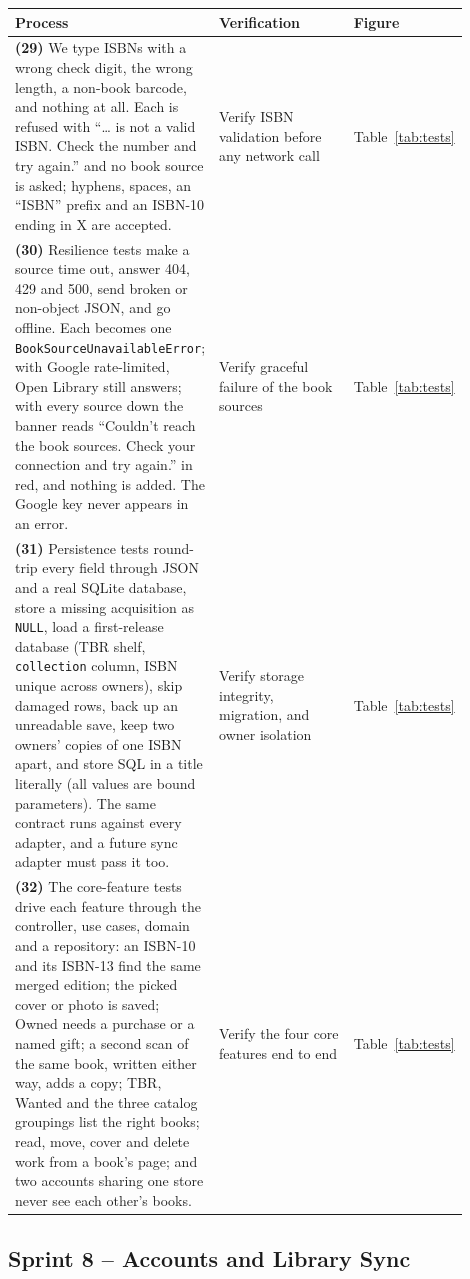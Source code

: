 \documentclass[12pt]{article}
\begin{document}
\begin{longtable}{L{0.4\linewidth} L{0.36\linewidth} L{0.14\linewidth}}
\toprule
\textbf{Process} & \textbf{Verification} & \textbf{Figure} \\
\midrule
\endhead
\textbf{(29)} We type ISBNs with a wrong check digit, the wrong length, a non-book barcode, and nothing at all. Each is refused with ``\ldots{} is not a valid ISBN. Check the number and try again.'' and no book source is asked; hyphens, spaces, an ``ISBN'' prefix and an ISBN-10 ending in X are accepted. & Verify ISBN validation before any network call & Table~\ref{tab:tests} \\
\textbf{(30)} Resilience tests make a source time out, answer 404, 429 and 500, send broken or non-object JSON, and go offline. Each becomes one \texttt{BookSourceUnavailableError}; with Google rate-limited, Open Library still answers; with every source down the banner reads ``Couldn't reach the book sources. Check your connection and try again.'' in red, and nothing is added. The Google key never appears in an error. & Verify graceful failure of the book sources & Table~\ref{tab:tests} \\
\textbf{(31)} Persistence tests round-trip every field through JSON and a real SQLite database, store a missing acquisition as \texttt{NULL}, load a first-release database (TBR shelf, \texttt{collection} column, ISBN unique across owners), skip damaged rows, back up an unreadable save, keep two owners' copies of one ISBN apart, and store SQL in a title literally (all values are bound parameters). The same contract runs against every adapter, and a future sync adapter must pass it too. & Verify storage integrity, migration, and owner isolation & Table~\ref{tab:tests} \\
\textbf{(32)} The core-feature tests drive each feature through the controller, use cases, domain and a repository: an ISBN-10 and its ISBN-13 find the same merged edition; the picked cover or photo is saved; Owned needs a purchase or a named gift; a second scan of the same book, written either way, adds a copy; TBR, Wanted and the three catalog groupings list the right books; read, move, cover and delete work from a book's page; and two accounts sharing one store never see each other's books. & Verify the four core features end to end & Table~\ref{tab:tests} \\
\bottomrule
\end{longtable}

\subsection{Sprint 8 -- Accounts and Library Sync}
\label{sec:sprint8}
\end{document}
